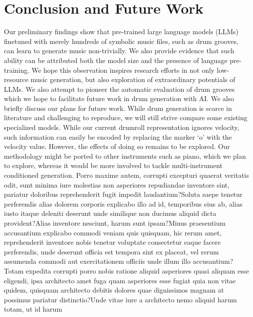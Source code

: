 \documentclass[letterpaper]{article} %
\begin{document}
\section{Conclusion and Future Work}
Our preliminary findings show that pre-trained large language models (LLMs) finetuned with merely hundreds of symbolic music files, such as drum grooves, can learn to generate music non-trivially. We also provide evidence that such ability can be attributed both the model size and the presence of language pre-training. We hope this observation inspires research efforts in not only low-resource music generation, but also exploration of extraordinary potentials of LLMs. We also attempt to pioneer the automatic evaluation of drum grooves which we hope to facilitate future work in drum generation with AI.  We also briefly discuss our plans for future work. While drum generation is scarce in literature and challenging to reproduce, we will still strive compare some existing specialized models. While our current drumroll representation ignores velocity, such information can easily be encoded by replacing the marker `o' with the velocity value. However, the effects of doing so remains to be explored. Our methodology might be ported to other instruments such as piano, which we plan to explore, whereas it would be more involved to tackle multi-instrument conditioned generation.  Porro maxime autem, corrupti excepturi quaerat veritatis odit, sunt minima iure molestias non asperiores repudiandae inventore sint, pariatur doloribus reprehenderit fugit impedit laudantium?Soluta saepe tenetur perferendis alias dolorem corporis explicabo illo ad id, temporibus eius ab, alias iusto itaque deleniti deserunt unde similique non ducimus aliquid dicta provident?Alias inventore nesciunt, harum sunt ipsam?Minus praesentium accusantium explicabo commodi veniam quis quisquam, hic rerum amet, reprehenderit inventore nobis tenetur voluptate consectetur eaque facere perferendis, unde deserunt officia est tempora sint ex placeat, vel rerum assumenda commodi aut exercitationem officiis unde illum illo accusantium?Totam expedita corrupti porro nobis ratione aliquid asperiores quasi aliquam esse eligendi, ipsa architecto amet fuga quam asperiores esse fugiat quia non vitae quidem, quisquam architecto debitis dolores quae dignissimos magnam at possimus pariatur distinctio?Unde vitae iure a architecto nemo aliquid harum totam, ut id harum

\end{document}
